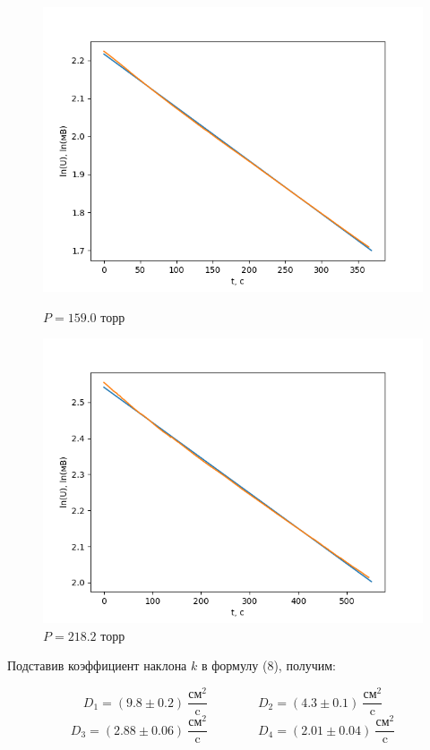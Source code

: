 \documentclass[a4paper]{article}
\begin{document}
\begin{figure}[!htb]
  \includegraphics[width=\linewidth]{159.png}
  \caption{$P = 159.0$ торр}
\endminipage\hfill
{}
  \includegraphics[width=\linewidth]{218.2.png}
  \caption{$P = 218.2$ торр}
\endminipage\hfill
\end{figure}

Подставив коэффициент наклона $k$ в формулу (8), получим:

\begin{equation*}
    D_1 = (9.8 \pm 0.2) \ \frac{\text{см}^2}{\text{c}} \qquad \qquad D_2 = (4.3 \pm 0.1) \ \frac{\text{см}^2}{\text{c}}
\end{equation*}
\begin{equation*}
    D_3 = (2.88 \pm 0.06) \ \frac{\text{см}^2}{\text{c}} \qquad \qquad D_4 = (2.01 \pm 0.04) \ \frac{\text{см}^2}{\text{c}}
\end{equation*}
\end{document}
